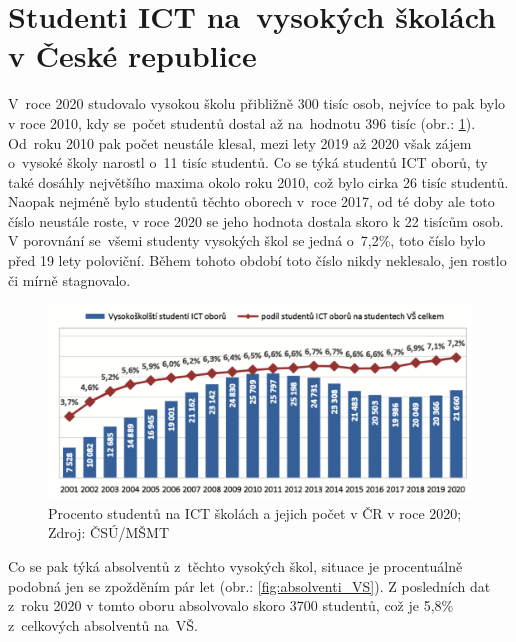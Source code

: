 \documentclass[12pt]{report}			%
\begin{document}
        \section{Studenti ICT na~vysokých školách v České republice}
            V~roce 2020 studovalo vysokou školu přibližně 300 tisíc osob, nejvíce to pak bylo v roce 2010, kdy se~počet studentů dostal až na~hodnotu 396 tisíc (obr.: \ref{fig:studenti_VS}). Od~roku 2010 pak počet neustále klesal, mezi lety 2019 až 2020 však zájem o~vysoké školy narostl o~11 tisíc studentů. Co se týká studentů ICT oborů, ty také dosáhly největšího maxima okolo roku 2010, což bylo cirka 26 tisíc studentů. Naopak nejméně bylo studentů těchto oborech v~roce 2017, od té doby ale toto číslo neustále roste, v roce 2020 se jeho hodnota dostala skoro k 22 tisícům osob. V porovnání se~všemi studenty vysokých škol se jedná o~7,2\%, toto číslo bylo před 19 lety poloviční. Během tohoto období toto číslo nikdy neklesalo, jen rostlo či mírně stagnovalo.~\cite{LidskeZdrojeVIT}
           
            \begin{figure}[h]
                \centering
                \includegraphics[width=16cm]{Maturitni Prace/images/studenti_VS.png}
                \caption[Rozložení studentů na ICT VŠ v 2020]{Procento studentů na ICT školách a jejich počet v ČR v roce 2020; Zdroj: ČSÚ/MŠMT}
                \label{fig:studenti_VS}
            \end{figure}
            
            Co se pak týká absolventů z~těchto vysokých škol, situace je procentuálně podobná jen se zpožděním pár let (obr.: \ref{fig:absolventi_VS}). Z posledních dat z~roku 2020 v tomto oboru absolvovalo skoro 3700 studentů, což je 5,8\% z~celkových absolventů na~VŠ.\cite{LidskeZdrojeVIT}
            
\end{document}
